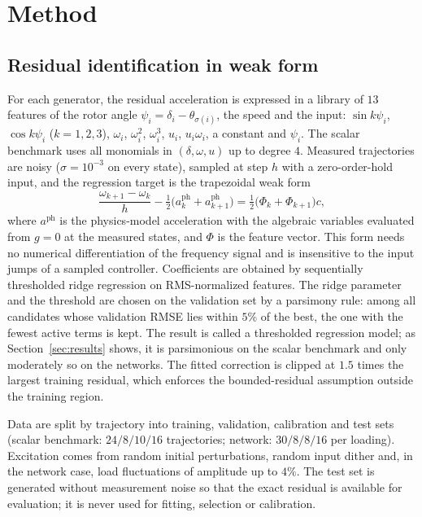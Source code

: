 \documentclass[preprint,12pt]{elsarticle}
\begin{document}
\section{Method}
\label{sec:method}
\subsection{Residual identification in weak form}
\label{sec:ident}
For each generator, the residual acceleration is expressed in a library of $13$ features of the rotor angle $\psi_i=\delta_i-\theta_{\sigma(i)}$, the speed and the input: $\sin k\psi_i$, $\cos k\psi_i$ ($k=1,2,3$), $\omega_i$, $\omega_i^2$, $\omega_i^3$, $u_i$, $u_i\omega_i$, a constant and $\psi_i$. The scalar benchmark uses all monomials in $(\delta,\omega,u)$ up to degree $4$. Measured trajectories are noisy ($\sigma=10^{-3}$ on every state), sampled at step $h$ with a zero-order-hold input, and the regression target is the trapezoidal weak form
\begin{equation}
\frac{\omega_{k+1}-\omega_k}{h} - \tfrac12\bigl(a^{\mathrm{ph}}_k + a^{\mathrm{ph}}_{k+1}\bigr) = \tfrac12\bigl(\Phi_k+\Phi_{k+1}\bigr)c ,
\label{eq:weak}
\end{equation}
where $a^{\mathrm{ph}}$ is the physics-model acceleration with the algebraic variables evaluated from $g=0$ at the measured states, and $\Phi$ is the feature vector. This form needs no numerical differentiation of the frequency signal and is insensitive to the input jumps of a sampled controller. Coefficients are obtained by sequentially thresholded ridge regression on RMS-normalized features. The ridge parameter and the threshold are chosen on the validation set by a parsimony rule: among all candidates whose validation RMSE lies within $5\%$ of the best, the one with the fewest active terms is kept. The result is called a thresholded regression model; as Section~\ref{sec:results} shows, it is parsimonious on the scalar benchmark and only moderately so on the networks. The fitted correction is clipped at $1.5$ times the largest training residual, which enforces the bounded-residual assumption outside the training region.

Data are split by trajectory into training, validation, calibration and test sets (scalar benchmark: $24/8/10/16$ trajectories; network: $30/8/8/16$ per loading). Excitation comes from random initial perturbations, random input dither and, in the network case, load fluctuations of amplitude up to $4\%$. The test set is generated without measurement noise so that the exact residual is available for evaluation; it is never used for fitting, selection or calibration.
\end{document}

